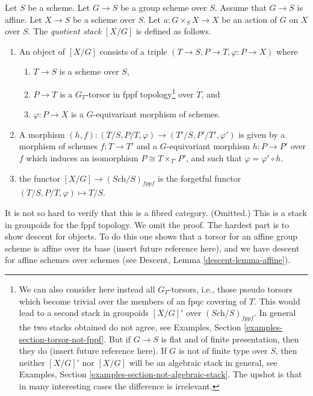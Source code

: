 \begin{example}
\label{example-X-mod-G-groupscheme}
Let $S$ be a scheme.
Let $G \to S$ be a group scheme over $S$.
Assume that $G \to S$ is affine.
Let $X \to S$ be a scheme over $S$.
Let $a : G \times_S X \to X$
be an action of $G$ on $X$ over $S$.
The {\it quotient stack} $[X/G]$ is defined as follows.
\begin{enumerate}
\item An object of $[X/G]$ consists of a triple
$(T \to S, P \to T, \varphi : P \to X)$ where
\begin{enumerate}
\item $T \to S$ is a scheme over $S$,
\item $P \to T$ is a $G_T$-torsor in fppf topology\footnote{We can also
consider here instead all $G_T$-torsors, i.e., those pseudo torsors which
become trivial over the members of an fpqc covering of $T$. This would lead
to a second stack in groupoids $[X/G]'$ over $(\textit{Sch}/S)_{fppf}$.
In general the two stacks obtained do not agree, see
Examples, Section \ref{examples-section-torsor-not-fppf}.
But if $G \to S$ is flat and of finite presentation,
then they do (insert future reference here). If $G$ is not
of finite type over $S$, then neither $[X/G]'$ nor $[X/G]$ will be
an algebraic stack in general, see
Examples, Section \ref{examples-section-not-algebraic-stack}.
The upshot is that in many interesting cases the difference is irrelevant.}
over $T$, and
\item $\varphi : P \to X$ is a $G$-equivariant morphism of schemes.
\end{enumerate}
\item A morphism
$(h, f) : (T/S, P/T, \varphi) \to (T'/S, P'/T', \varphi')$
is given by a morphism of schemes $f : T \to T'$ and a $G$-equivariant
morphism $h : P \to P'$ over $f$ which induces an isomorphism
$P \cong T \times_{T'} P'$, and such that $\varphi = \varphi' \circ h$.
\item the functor $[X/G] \to (\textit{Sch}/S)_{fppf}$ is the forgetful
functor $(T/S, P/T, \varphi) \mapsto T/S$.
\end{enumerate}
It is not so hard to verify that this is a fibred category. (Omitted.)
This is a stack in groupoids for the fppf topology. We omit the proof.
The hardest part is to show descent for objects. To do this one shows that
a torsor for an affine group scheme is affine over its base (insert future
reference here), and we have descent for affine schemes over schemes (see
Descent, Lemma \ref{descent-lemma-affine}).
\end{example}

